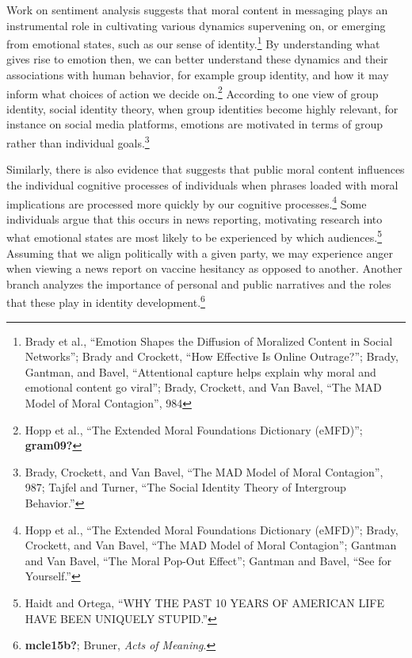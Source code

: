 \documentclass[phdthesis,12pt,final]{wuthesis}
\theoremstyle{definition}
\theoremstyle{definition}
\theoremstyle{definition}
\theoremstyle{definition}
\theoremstyle{remark}
\begin{document}
Work on sentiment analysis suggests that moral content in messaging plays an instrumental role in cultivating various dynamics supervening on, or emerging from emotional states, such as our sense of identity.\footnote{Brady et al., {``Emotion Shapes the Diffusion of Moralized Content in Social Networks''}; Brady and Crockett, {``How Effective Is Online Outrage?''}; Brady, Gantman, and Bavel, {``Attentional capture helps explain why moral and emotional content go viral''}; Brady, Crockett, and Van Bavel, {``The {MAD} Model of Moral Contagion''}, 984} By understanding what gives rise to emotion then, we can better understand these dynamics and their associations with human behavior, for example group identity, and how it may inform what choices of action we decide on.\footnote{Hopp et al., {``The Extended {Moral Foundations Dictionary} ({eMFD})''}; \textbf{gram09?}} According to one view of group identity, social identity theory, when group identities become highly relevant, for instance on social media platforms, emotions are motivated in terms of group rather than individual goals.\footnote{Brady, Crockett, and Van Bavel, {``The {MAD} Model of Moral Contagion''}, 987; Tajfel and Turner, {``The {Social Identity Theory} of {Intergroup Behavior}.''}}

Similarly, there is also evidence that suggests that public moral content influences the individual cognitive processes of individuals when phrases loaded with moral implications are processed more quickly by our cognitive processes.\footnote{Hopp et al., {``The Extended {Moral Foundations Dictionary} ({eMFD})''}; Brady, Crockett, and Van Bavel, {``The {MAD} Model of Moral Contagion''}; Gantman and Van Bavel, {``The Moral Pop-Out Effect''}; Gantman and Bavel, {``See for Yourself.''}} Some individuals argue that this occurs in news reporting, motivating research into what emotional states are most likely to be experienced by which audiences.\footnote{Haidt and Ortega, {``{WHY THE PAST} 10 {YEARS OF AMERICAN LIFE HAVE BEEN UNIQUELY STUPID}.''}} Assuming that we align politically with a given party, we may experience anger when viewing a news report on vaccine hesitancy as opposed to another. Another branch analyzes the importance of personal and public narratives and the roles that these play in identity development.\footnote{\textbf{mcle15b?}; Bruner, \emph{Acts of Meaning}.}
\end{document}
